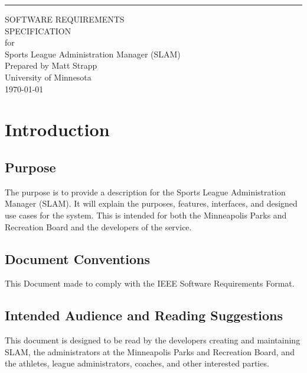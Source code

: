 \documentclass{scrreprt}
\date{}
\begin{document}
\begin{flushright}
    \rule{16cm}{5pt}\vskip1cm
    \begin{bfseries}
        \Huge{SOFTWARE REQUIREMENTS\\ SPECIFICATION}\\
        \vspace{1.9cm}
        for\\
        \vspace{1.9cm}
        Sports League Administration Manager (SLAM)\\
        \vspace{1.9cm}
        Prepared by Matt Strapp\\
        \vspace{1.9cm}
        University of Minnesota\\
        \vspace{1.9cm}
        \today\\
    \end{bfseries}
\end{flushright}

\tableofcontents


\chapter{Introduction}

\section{Purpose}

The purpose is to provide a description for the Sports League Administration Manager (SLAM). It will explain the purposes, features, interfaces, and designed use cases for the system. This is intended for both the Minneapolis Parks and Recreation Board and the developers of the service.

\section{Document Conventions}

This Document made to comply with the IEEE Software Requirements Format.

\section{Intended Audience and Reading Suggestions}
This document is designed to be read by the developers creating and maintaining SLAM, the administrators at the Minneapolis Parks and Recreation Board, and the athletes, league administrators, coaches, and other interested parties.
\end{document}
